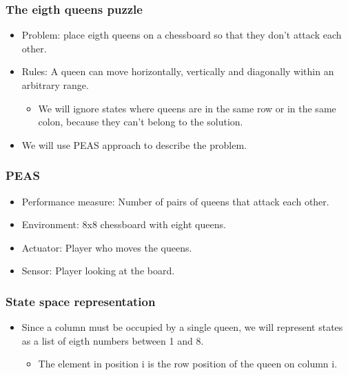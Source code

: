 \documentclass{beamer}
\begin{document}
    \begin{frame}
    \frametitle{The eigth queens puzzle}
    \begin{itemize}
        \item Problem: place eigth queens on a chessboard so that they don't attack each other.
        \pause
        \item Rules: A queen can move horizontally, vertically and diagonally within an arbitrary range.
        \pause
            \begin{itemize}
                \item We will ignore states where queens are in the same row or in the same colon, because they can't belong to the solution.
            \end{itemize}
        \pause
        \item We will use PEAS approach to describe the problem.
    \end{itemize}
    \end{frame}

    \begin{frame}
    \frametitle{PEAS}
    \pause
        \begin{itemize}
            \item Performance measure: Number of pairs of queens that attack each other.
            \pause
            \item Environment: 8x8 chessboard with eight queens. 
            \pause
            \item Actuator: Player who moves the queens.
            \pause
            \item Sensor: Player looking at the board.
        \end{itemize}
    \end{frame}

    \begin{frame}
    \frametitle{State space representation}
    \pause
        \begin{itemize}
            \item Since a column must be occupied by a single queen, we will represent states as a list of eigth numbers between 1 and 8.
            \pause
            \begin{itemize}
                \item The element in position i is the row position of the queen on column i.
            \end{itemize}
        \end{itemize}
    \end{frame}
\end{document}
